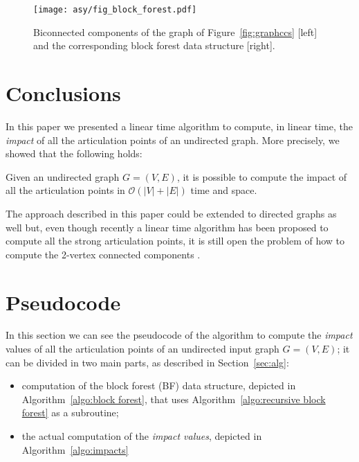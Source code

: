 \documentclass{llncs}
\newcommand{\bigoh}{\mathcal{O}}
\begin{document}
\begin{figure}[t!]
	\centering {}\hfill 	\texttt{[image: asy/fig\_block\_forest.pdf]}
	\caption{Biconnected components of the graph of Figure~\ref{fig:graphccs} [left] and the corresponding block forest data structure [right].\label{fig:bfds}}
\end{figure}

\section{Conclusions}
\label{sec:conclusions}

In this paper we presented a linear time algorithm to compute, in linear time, the \emph{impact} of all the articulation points of an undirected graph. More precisely, we showed that the following holds:
\begin{theorem}
	Given an undirected graph $G = (V, E)$, it is possible to compute the impact of all the articulation points in $\bigoh(|V| + |E|)$ time and space.
\end{theorem}
The approach described in this paper could be extended to directed graphs as well but, even though recently a linear time algorithm has been proposed to compute all the strong articulation points, it is still open the problem of how to compute the 2-vertex connected components \cite{ILS12}.






\vfill 
\iffalse
\pagebreak
\appendix
\section{Pseudocode}

In this section we can see the pseudocode of the algorithm to compute the \emph{impact} values of all the articulation points of an undirected input graph $G = (V, E)$; it can be divided in two main parts, as described in Section~\ref{sec:alg}: 
\begin{itemize}
\item computation of the block forest (BF) data structure, depicted in Algorithm~\ref{algo:block forest}, that uses Algorithm~\ref{algo:recursive block forest} as a subroutine;
\item the actual computation of the \emph{impact values}, depicted in Algorithm~\ref{algo:impacts}
\end{itemize}
\end{document}
